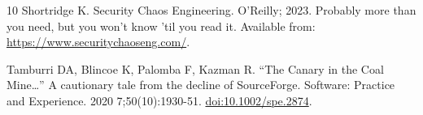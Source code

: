 \documentclass[10pt,letterpaper]{article}
\begin{document}
\begin{thebibliography}{10}
Shortridge K.
\newblock Security Chaos Engineering.
\newblock O'Reilly; 2023.
\newblock Probably more than you need, but you won't know 'til you read it.
\newblock Available from: \url{https://www.securitychaoseng.com/}.

Tamburri DA, Blincoe K, Palomba F, Kazman R.
\newblock ``The Canary in the Coal Mine…'' A cautionary tale from the decline
  of SourceForge.
\newblock Software: Practice and Experience. 2020 7;50(10):1930-51.
\newblock \href {http://dx.doi.org/10.1002/spe.2874} {doi:10.1002/spe.2874}.

\end{thebibliography}
\end{document}

